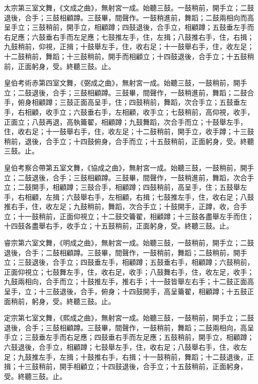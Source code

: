 \begin{pinyinscope}
 太宗第三室文舞，《文成之曲》，無射宮一成。始聽三鼓。一鼓稍前，開手立；二鼓退後，合手；三鼓相顧蹲。三鼓畢，間聲作。一鼓稍進前，舞蹈；二鼓兩相向而高呈手立；三鼓稍前，開手立，相顧蹲；四鼓退後，合手立，相顧蹲；五鼓垂左手而右足應；六鼓垂右手而左足應；七鼓推左手，住，左揖；八鼓推右手，住，右揖；九鼓稍前，仰視，正揖；十鼓舉左手，住，收右足；十一鼓舉右手，住，收左足；十二鼓稍前，舞蹈；十三鼓稍前，開手而相顧立；十四鼓退後，合手立；十五鼓稍前，正面躬身，受。終聽三鼓。止。



 皇伯考術赤第四室文舞，《弼成之曲》，無射宮一成。始聽三鼓，一鼓稍前，開手立；二鼓退後，合手；三鼓相顧蹲。三鼓畢，間聲作，一鼓稍進前，舞蹈；二鼓合手，俯身相顧蹲；三鼓正面高呈手，住；四鼓稍前，舞蹈，次合手立；五鼓垂左手，右相顧，收手立；六鼓垂右手，左相顧，收手立；七鼓稍前，高仰視，收手，正面立；八鼓再退，高執籥翟，相顧蹲；九鼓舞蹈，次合手而立；十鼓舉左手，住，收右足；十一鼓舉右手，住，收左足；十二鼓稍前，開手立，收手蹲；十三鼓稍前，退後，合手立；十四鼓俯身，合手而立；十五鼓稍前，正面躬身，受。終聽三鼓。止。



 皇伯考察合帶第五室文舞，《協成之曲》，無射宮一成。始聽三鼓，一鼓稍前，開手立；二鼓退後，合手；三鼓相顧蹲。三鼓畢，間聲作，一鼓稍進前，舞蹈，次合手立；二鼓開手，相顧蹲；三鼓合手，相顧蹲；四鼓稍前，高呈手，住；五鼓舉左手，右相顧，左揖；六鼓舉右手，左相顧，右揖；七鼓推左手，住，收右足；八鼓推右手，住，收左足；九鼓稍前，舞蹈，次合手立；十鼓開手，正蹲，收，合手立；十一鼓稍前，正面仰視立；十二鼓交籥翟，相顧蹲；十三鼓各盡舉左手而住；十四鼓各盡舉右手，收手立；十五鼓稍前，正面躬身，受。終聽三鼓。止。



 睿宗第六室文舞，《明成之曲》，無射宮一成。始聽三鼓，一鼓稍前，開手立；二鼓退後，合手；二鼓相顧蹲。三鼓畢，間聲作，一鼓稍前，舞蹈；二鼓稍前，開手立；三鼓退後，合手立；四鼓垂左手，相顧蹲；五鼓垂右手，相顧蹲；六鼓稍前，正面仰視立；七鼓舞左手，住，收右足，收手；八鼓舞右手，住，收左足，收手；九鼓兩相向，合手而立；十鼓推左手，推右手；十一鼓皆舉左右手；十二鼓正面高呈手，立；十三鼓退後，合手，俯身；十四鼓開手，高呈籥翟，相顧蹲；十五鼓正面稍前，躬身，受。終聽三鼓。止。



 定宗第七室文舞，《熙成之曲》，無射宮一成。始聽三鼓，一鼓稍前，開手立；二鼓退後，合手；三鼓相顧蹲。三鼓畢，間聲作，一鼓稍前，舞蹈；二鼓兩相向，高呈手立；三鼓垂左手而右足應；四鼓垂右手而左足應；五鼓稍前，開手立，相顧蹲；六鼓退後，合手立，相顧蹲；七鼓舉左手，住，收右足；八鼓舉右手，住，收左足；九鼓推左手，左揖；十鼓推右手，右揖；十一鼓稍前，舞蹈；十二鼓退後，正揖；十三鼓稍前，開手相顧立；十四鼓退後，合手立；十五鼓稍前，正面躬身，受。終聽三鼓。止。




\end{pinyinscope}
